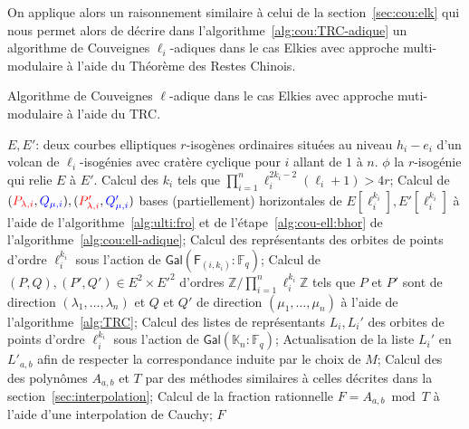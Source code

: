\documentclass[10pt,a4paper]{book}
\theoremstyle{plain}
\theoremstyle{definition}
\theoremstyle{definition}
\theoremstyle{definition}
\theoremstyle{definition}
\theoremstyle{remark}
\theoremstyle{remark}
\theoremstyle{definition}
\begin{document}
On applique alors un raisonnement similaire à celui de la 
section~\ref{sec:cou:elk} qui nous permet alors de décrire dans 
l'algorithme~\ref{alg:cou:TRC-adique} un algorithme de Couveignes 
$\ell_i$-adiques dans le cas Elkies avec approche multi-modulaire à l'aide du 
Théorème des Restes Chinois.
 
\begin{algorithm}
\caption{\label{alg:cou:TRC-adique} Algorithme de Couveignes $\ell$-adique dans le cas Elkies avec approche muti-modulaire à l'aide du TRC.}
\begin{algorithmic}[1]
\REQUIRE $E,E'$: deux courbes elliptiques $r$-isogènes ordinaires situées au niveau $h_i-e_i$ d'un volcan de $\ell_i$-isogénies avec cratère cyclique pour $i$ allant de $1$ à $n$.
\ENSURE $\phi$ la $r$-isogénie qui relie $E$ à $E'$.
\STATE Calcul des $k_i$ tels que $\prod_{i=1}^n\ell_{i}^{2k_{i}-2}(\ell_{i}+1)>4r$;
\STATE \label{alg:cou:TRC-adique:bhor} Calcul de $(\color{red}P_{\lambda,i}\color{black},\color{blue}Q_{\mu,i}\color{black}),(\color{red}P'_{\lambda,i}\color{black},\color{blue}Q_{\mu,i}'\color{black})$ bases (partiellement) horizontales de $E[\ell_i^{k_i}],E'[\ell_i^{k_i}]$ à l'aide de l'algorithme~\ref{alg:ulti:fro} et de l'étape~\ref{alg:cou-ell:bhor} de l'algorithme~\ref{alg:cou:ell-adique};
\STATE \label{alg:cou:TRC_adique:rep:uni} Calcul des représentants des orbites de points d'ordre $\ell_i^{k_i}$ sous l'action de $\mathsf{Gal}(\mathsf{F}_{(i,k_i)}:\mathbb{F}_q)$;
\ENDFOR
\STATE \label{alg:cou:TRC-adique:TRC} Calcul de $(P,Q),(P',Q') \in E^2 \times E'^2$ d'ordres $ \mathbb{Z}/\prod_{i=1}^n \ell_i^{k_i}\mathbb{Z}$ tels que $P$ et $P'$ sont de direction $(\lambda_1, \dots, \lambda_n)$ et $Q$ et $Q'$ de direction $(\mu_1, \dots, \mu_n)$ à l'aide de l'algorithme~\ref{alg:TRC};
\STATE \label{alg:cou:TRC-adique:rep} Calcul des listes de représentants $L_i,L_i'$ des orbites de points d'ordre $\ell_i^{k_i}$ sous l'action de $\mathsf{Gal}(\mathbb{K}_n:\mathbb{F}_q)$;
\STATE \label{alg:cou:TRC-adique:ord} Actualisation de la liste $L_i'$ en $L'_{a,b}$ afin de respecter la correspondance induite par le choix de $M$;
\STATE \label{alg:cou:TRC-adique:int} Calcul des des polynômes $A_{a,b}$ et $T$ par des méthodes similaires à celles décrites dans la section~\ref{sec:interpolation};
\STATE \label{alg:cou:TRC-adique:Cauchy} Calcul de la fraction rationnelle $F=A_{a,b} \bmod T$ à l'aide d'une interpolation de Cauchy;
 \label{alg:cou:TRC-adique:test}
\RETURN $F$
\ENDIF
\ENDFOR 
\end{algorithmic}
\end{algorithm}
\end{document}
